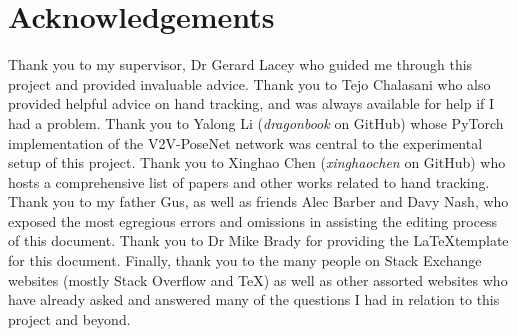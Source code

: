 \section*{\Huge{Acknowledgements}}
Thank you to my supervisor, Dr Gerard Lacey who guided me through this project and provided invaluable advice. Thank you to Tejo Chalasani who also provided helpful advice on hand tracking, and was always available for help if I had a problem. Thank you to Yalong Li ({\slshape dragonbook} on GitHub) whose PyTorch implementation of the V2V-PoseNet network was central to the experimental setup of this project. Thank you to Xinghao Chen ({\slshape xinghaochen} on GitHub) who hosts a comprehensive list of papers and other works related to hand tracking. Thank you to my father Gus, as well as friends Alec Barber and Davy Nash, who exposed the most egregious errors and omissions in assisting the editing process of this document. Thank you to Dr Mike Brady for providing the \LaTeX template for this document. Finally, thank you to the many people on Stack Exchange websites (mostly Stack Overflow and \TeX) as well as other assorted websites who have already asked and answered many of the questions I had in relation to this project and beyond.
